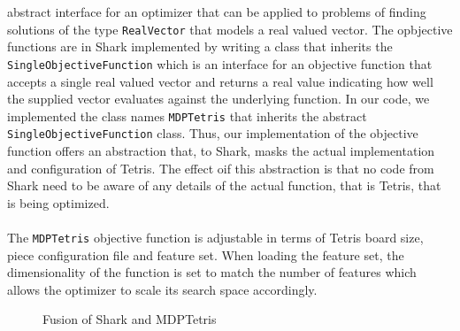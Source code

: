 abstract interface for an optimizer that can be applied to problems of finding 
solutions of the type \lstinline$RealVector$ that models a real valued vector.
The opbjective functions are in Shark implemented by writing a class that inherits 
the \lstinline$SingleObjectiveFunction$ which is an interface for an objective function 
that accepts a single real valued vector and returns a real value indicating how well the supplied
vector evaluates against the underlying function. In our code, we implemented the class names 
\lstinline$MDPTetris$ that inherits the abstract \lstinline$SingleObjectiveFunction$ class.
Thus, our implementation of the objective function offers an abstraction that, to Shark, masks
the actual implementation and configuration of Tetris. The effect oif this abstraction is that 
no code from Shark need to be aware of any details of the actual function, that is Tetris, 
that is being optimized.\\
\\
The \lstinline$MDPTetris$ objective function is adjustable in terms of Tetris board size, piece 
configuration file and feature set. When loading the feature set, the dimensionality of 
the function is set to match the number of features which allows the optimizer to 
scale its search space accordingly.
\begin{figure}[h!]
\begin{center}
\end{center}
\caption{Fusion of Shark and MDPTetris}
\end{figure}


